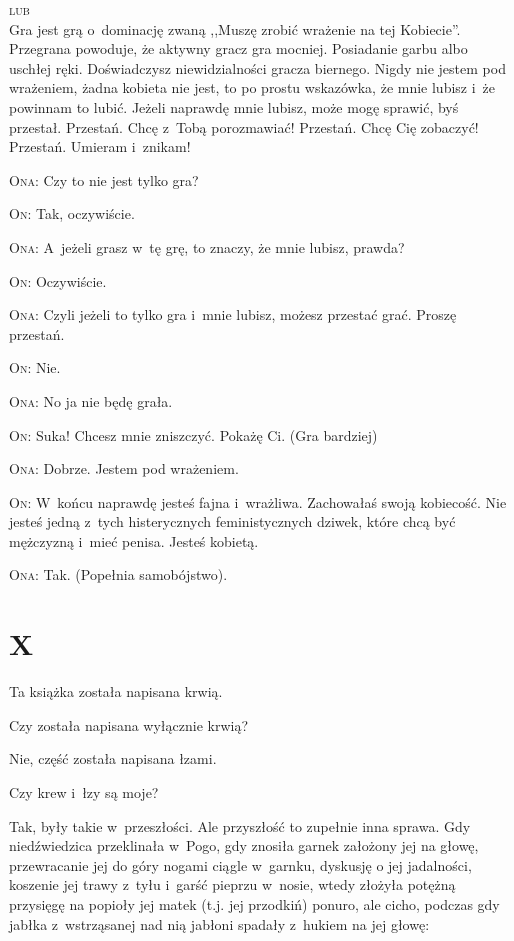 \documentclass[oneside,polish,12pt,sfheadings]{mwbk}
\begin{document}
\textsc{lub}\\

Gra jest grą o~dominację zwaną ,,Muszę zrobić wrażenie na tej Kobiecie''.
Przegrana powoduje, że aktywny gracz gra mocniej. Posiadanie garbu
albo uschłej ręki. Doświadczysz niewidzialności gracza biernego. Nigdy
nie jestem pod wrażeniem, żadna kobieta nie jest, to po prostu wskazówka,
że mnie lubisz i~że powinnam to lubić. Jeżeli naprawdę mnie lubisz,
może mogę sprawić, byś przestał. Przestań. Chcę z~Tobą porozmawiać!
Przestań. Chcę Cię zobaczyć! Przestań. Umieram i~znikam!

\textsc{Ona}: Czy to nie jest tylko gra?

\textsc{On}: Tak, oczywiście.

\textsc{Ona}: A~jeżeli grasz w~tę grę, to znaczy, że mnie lubisz, prawda?

\textsc{On}: Oczywiście.

\textsc{Ona}: Czyli jeżeli to tylko gra i~mnie lubisz, możesz przestać grać.
Proszę przestań.

\textsc{On}: Nie.

\textsc{Ona}: No ja nie będę grała.

\textsc{On}: Suka! Chcesz mnie zniszczyć. Pokażę Ci. (Gra bardziej)

\textsc{Ona}: Dobrze. Jestem pod wrażeniem.

\textsc{On}: W~końcu naprawdę jesteś fajna i~wrażliwa. Zachowałaś swoją kobiecość.
Nie jesteś jedną z~tych histerycznych feministycznych dziwek, które
chcą być mężczyzną i~mieć penisa. Jesteś kobietą.

\textsc{Ona}: Tak. (Popełnia samobójstwo).

\chapter{X}

Ta książka została napisana krwią.

Czy została napisana wyłącznie krwią?

Nie, część została napisana łzami.

Czy krew i~łzy są moje?

Tak, były takie w~przeszłości. Ale przyszłość to zupełnie inna sprawa.
Gdy niedźwiedzica przeklinała w~Pogo, gdy znosiła garnek założony
jej na głowę, przewracanie jej do góry nogami ciągle w~garnku, dyskusję
o jej jadalności, koszenie jej trawy z~tyłu i~garść pieprzu w~nosie,
wtedy złożyła potężną przysięgę na popioły jej matek (t.j. jej przodkiń)
ponuro, ale cicho, podczas gdy jabłka z~wstrząsanej nad nią jabłoni
spadały z~hukiem na jej głowę: 
\end{document}
